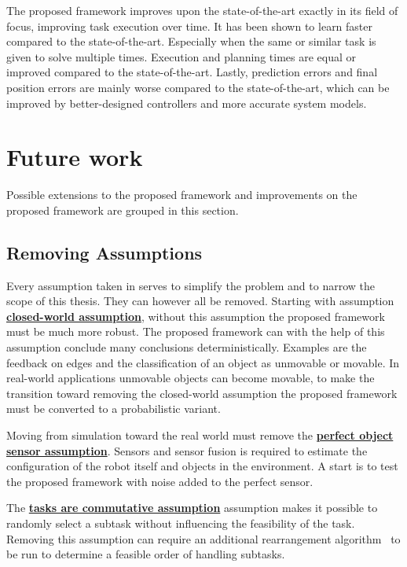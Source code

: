 The proposed framework improves upon the state-of-the-art exactly in its field of focus, improving task execution over time. It has been shown to learn faster compared to the state-of-the-art. Especially when the same or similar task is given to solve multiple times. Execution and planning times are equal or improved compared to the state-of-the-art. Lastly, prediction errors and final position errors are mainly worse compared to the state-of-the-art, which can be improved by better-designed controllers and more accurate system models. 



\section{Future work}%
\label{sec:future_work}
Possible extensions to the proposed framework and improvements on the proposed framework are grouped in this section.\bs

\subsection{Removing Assumptions}
Every assumption taken in  serves to simplify the problem and to narrow the scope of this thesis. They can however all be removed. Starting with assumption \hyperref[assumption:closed_world]{\textbf{closed-world assumption}}, without this assumption the proposed framework must be much more robust. The proposed framework can with the help of this assumption conclude many conclusions deterministically. Examples are the feedback on edges and the classification of an object as unmovable or movable. In real-world applications unmovable objects can become movable, to make the transition toward removing the closed-world assumption the proposed framework must be converted to a probabilistic variant.\bs

Moving from simulation toward the real world must remove the \hyperref[assumption:perfect_object_sensor]{\textbf{perfect object sensor assumption}}. Sensors and sensor fusion is required to estimate the configuration of the robot itself and objects in the environment. A start is to test the proposed framework with noise added to the perfect sensor.\bs

The \hyperref[assumption:order_does_not_matter]{\textbf{tasks are commutative assumption}} assumption makes it possible to randomly select a subtask without influencing the feasibility of the task. Removing this assumption can require an additional rearrangement algorithm~\cite{krontiris_dealing_2015} to be run to determine a feasible order of handling subtasks.\bs


